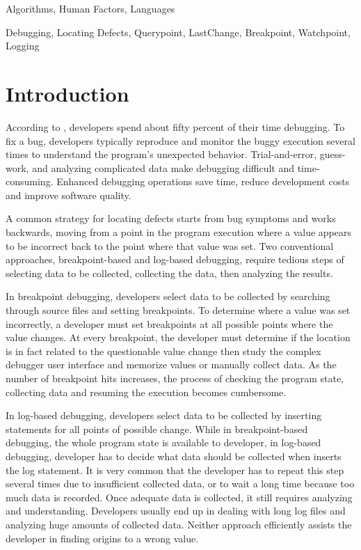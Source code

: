 \documentclass{sig-alternate}
\begin{document}
\terms
{Algorithms, Human Factors, Languages}

\keywords
{Debugging, Locating Defects, Querypoint, LastChange, Breakpoint,
 Watchpoint, Logging}

\section{Introduction}

According to  \cite{LaToza}, developers spend about fifty percent of
their time debugging. To fix a bug, developers typically reproduce 
and monitor the buggy execution several times to understand the 
program's unexpected behavior. Trial-and-error, guess-work, and 
analyzing complicated data make debugging difficult and time-consuming. 
Enhanced debugging operations save  
time, reduce development costs and improve software quality.

A common strategy for locating defects starts from bug symptoms and
works backwards, moving from a point in the program execution where a
value appears to be incorrect back to the point where that value was
set.  Two conventional approaches, breakpoint-based and
log-based debugging, require tedious steps of
selecting data to be collected, collecting the data, then analyzing
the results. 

In breakpoint debugging, developers select data to be collected by
searching through source files and setting breakpoints. To determine
where a value was set incorrectly, a developer must set
breakpoints at all possible points where the value changes. At
every breakpoint, the developer must determine if the location is in
fact related to the questionable value change then study the complex
debugger user interface and memorize values or manually collect
data. As the number of breakpoint hits increases, the process of
checking the program state, collecting data and resuming the execution
becomes cumbersome.

In log-based debugging, developers select data to be collected by
inserting statements for all points of possible change.  While in
breakpoint-based debugging, the whole program state is available to
developer, in log-based debugging, developer has to decide what data
should be collected when inserts the log statement. It is very common
that the developer has to repeat this step several times due to
insufficient collected data, or to wait a long time because too much
data is recorded. Once adequate data is collected, it still
requires analyzing and understanding. Developers usually end up in
dealing with long log files and analyzing huge amounts of collected data. 
Neither approach efficiently assists the developer in finding origins to a wrong
value.
\end{document}
